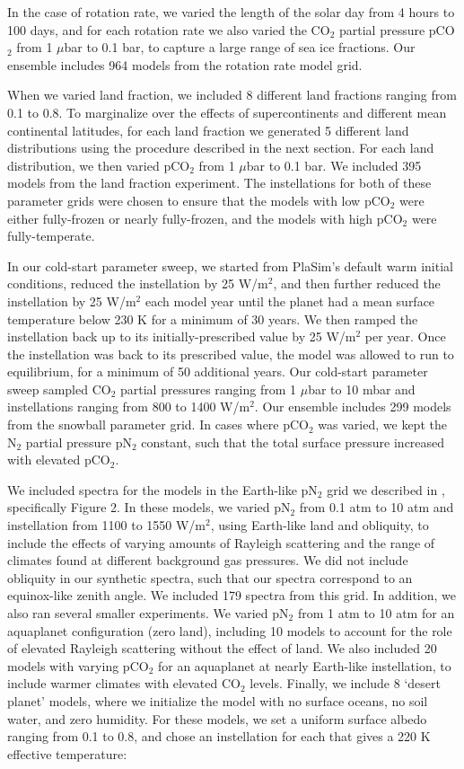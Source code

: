\documentclass[fleqn,usenatbib]{mnras}
\begin{document}
In the case of rotation rate, we varied the length of the solar day from 4 hours to 100 days, and for each rotation rate we also varied the CO$_2$ partial pressure pCO$_2$ from 1 $\mu$bar to 0.1 bar, to capture a large range of sea ice fractions. Our ensemble includes 964 models from the rotation rate model grid. 

When we varied land fraction, we included 8 different land fractions ranging from 0.1 to 0.8. To marginalize over the effects of supercontinents and different mean continental latitudes, for each land fraction we generated 5 different land distributions using the procedure described in the next section. For each land distribution, we then varied pCO$_2$ from 1 $\mu$bar to 0.1 bar. We included 395 models from the land fraction experiment. The instellations for both of these parameter grids were chosen to ensure that the models with low pCO$_2$ were either fully-frozen or nearly fully-frozen, and the models with high pCO$_2$ were fully-temperate. 

In our cold-start parameter sweep, we started from PlaSim's default warm initial conditions, reduced the instellation by 25 W/m$^2$, and then further reduced the instellation by 25 W/m$^2$ each model year until the planet had a mean surface temperature below 230 K for a minimum of 30 years. We then ramped the instellation back up to its initially-prescribed value by 25 W/m$^2$ per year. Once the instellation was back to its prescribed value, the model was allowed to run to equilibrium, for a minimum of 50 additional years. Our cold-start parameter sweep sampled CO$_2$ partial pressures ranging from 1 $\mu$bar to 10 mbar and instellations ranging from 800 to 1400 W/m$^2$. Our ensemble includes 299 models from the snowball parameter grid. In cases where pCO$_2$ was varied, we kept the N$_2$ partial pressure pN$_2$ constant, such that the total surface pressure increased with elevated pCO$_2$.

We included spectra for the models in the Earth-like pN$_2$ grid we described in \citet{Paradise2021}, specifically Figure 2. In these models, we varied pN$_2$ from 0.1 atm to 10 atm and instellation from 1100 to 1550 W/m$^2$, using Earth-like land and obliquity, to include the effects of varying amounts of Rayleigh scattering and the range of climates found at different background gas pressures. We did not include obliquity in our synthetic spectra, such that our spectra correspond to an equinox-like zenith angle. We included 179 spectra from this grid. In addition, we also ran several smaller experiments. We varied pN$_2$ from 1 atm to 10 atm for an aquaplanet configuration (zero land), including 10 models to account for the role of elevated Rayleigh scattering without the effect of land. We also included 20 models with varying pCO$_2$ for an aquaplanet at nearly Earth-like instellation, to include warmer climates with elevated CO$_2$ levels. Finally, we include 8 `desert planet' models, where we initialize the model with no surface oceans, no soil water, and zero humidity. For these models, we set a uniform surface albedo ranging from 0.1 to 0.8, and chose an instellation for each that gives a 220 K effective temperature:
\end{document}
